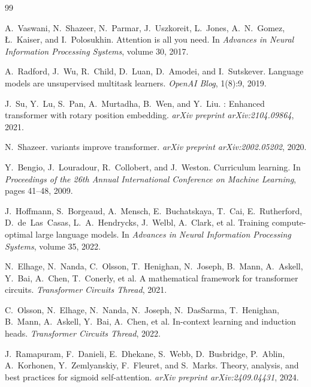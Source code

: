 \documentclass[10pt,a4paper]{article}
\begin{document}

\begin{thebibliography}{99}

A.~Vaswani, N.~Shazeer, N.~Parmar, J.~Uszkoreit, L.~Jones, A.~N.~Gomez, {\L}.~Kaiser, and I.~Polosukhin.
\newblock Attention is all you need.
\newblock In \textit{Advances in Neural Information Processing Systems}, volume 30, 2017.

A.~Radford, J.~Wu, R.~Child, D.~Luan, D.~Amodei, and I.~Sutskever.
\newblock Language models are unsupervised multitask learners.
\newblock \textit{OpenAI Blog}, 1(8):9, 2019.

J.~Su, Y.~Lu, S.~Pan, A.~Murtadha, B.~Wen, and Y.~Liu.
: Enhanced transformer with rotary position embedding.
\newblock \textit{arXiv preprint arXiv:2104.09864}, 2021.

N.~Shazeer.
 variants improve transformer.
\newblock \textit{arXiv preprint arXiv:2002.05202}, 2020.

Y.~Bengio, J.~Louradour, R.~Collobert, and J.~Weston.
\newblock Curriculum learning.
\newblock In \textit{Proceedings of the 26th Annual International Conference on Machine Learning}, pages 41--48, 2009.

J.~Hoffmann, S.~Borgeaud, A.~Mensch, E.~Buchatskaya, T.~Cai, E.~Rutherford, D.~de~Las~Casas, L.~A.~Hendrycks, J.~Welbl, A.~Clark, et al.
\newblock Training compute-optimal large language models.
\newblock In \textit{Advances in Neural Information Processing Systems}, volume 35, 2022.

N.~Elhage, N.~Nanda, C.~Olsson, T.~Henighan, N.~Joseph, B.~Mann, A.~Askell, Y.~Bai, A.~Chen, T.~Conerly, et al.
\newblock A mathematical framework for transformer circuits.
\newblock \textit{Transformer Circuits Thread}, 2021.

C.~Olsson, N.~Elhage, N.~Nanda, N.~Joseph, N.~DasSarma, T.~Henighan, B.~Mann, A.~Askell, Y.~Bai, A.~Chen, et al.
\newblock In-context learning and induction heads.
\newblock \textit{Transformer Circuits Thread}, 2022.

J.~Ramapuram, F.~Danieli, E.~Dhekane, S.~Webb, D.~Busbridge, P.~Ablin, A.~Korhonen, Y.~Zemlyanskiy, F.~Fleuret, and S.~Marks.
\newblock Theory, analysis, and best practices for sigmoid self-attention.
\newblock \textit{arXiv preprint arXiv:2409.04431}, 2024.


\end{thebibliography}
\end{document}
